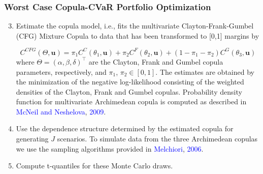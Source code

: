 \documentclass[pdf,10pt,xcolor=dvipsnames,hide notes]{beamer}
\begin{document}
\begin{frame}[label=frame5b]
	\frametitle{Worst Case Copula-CVaR Portfolio Optimization}
	
	\begin{enumerate}
		\setcounter{enumi}{2}
		\justifying
		\item Estimate the copula model, i.e., fits the multivariate Clayton-Frank-Gumbel
		(CFG) Mixture Copula to data that has been transformed to [0,1] margins by
		
		\begin{equation}
		C^{CFG}( \Theta ,\mathbf{u}) =\pi _{1}C^{C}( \theta _{1},\mathbf{u}) +\pi
		_{2}C^{F}( \theta _{2},\mathbf{u}) +(1-\pi _{1}-\pi _{2}) C^{G}( \theta _{3},%
		\mathbf{u})
		\end{equation}
		where $\Theta=\left(\alpha,\beta,\delta\right)^{\top }$ are the Clayton,
		Frank and Gumbel copula parameters, respectively, and $\pi_{1}$, $\pi_{2}
		\in [0,1]$. The estimates are obtained by the minimization of the negative
		log-likelihood consisting of the weighted densities of the Clayton, Frank
		and Gumbel copulas. Probability density function for multivariate
		Archimedean copula is computed as described in \textcolor{blue}{McNeil and Neshelova}, \textcolor{blue}{2009}.
		
		\vspace{0.3cm}

		\item Use
		the dependence structure determined by the estimated copula for generating $%
		J $ scenarios. To simulate data from the three Archimedean copulas we use
		the sampling algorithms provided in \textcolor{blue}{Melchiori}, \textcolor{blue}{2006}.
		
		
		\vspace{0.3cm}
		
		\item Compute
		t-quantiles for these Monte Carlo draws. 
		
		\end{enumerate}
	
\end{frame}
\end{document}
